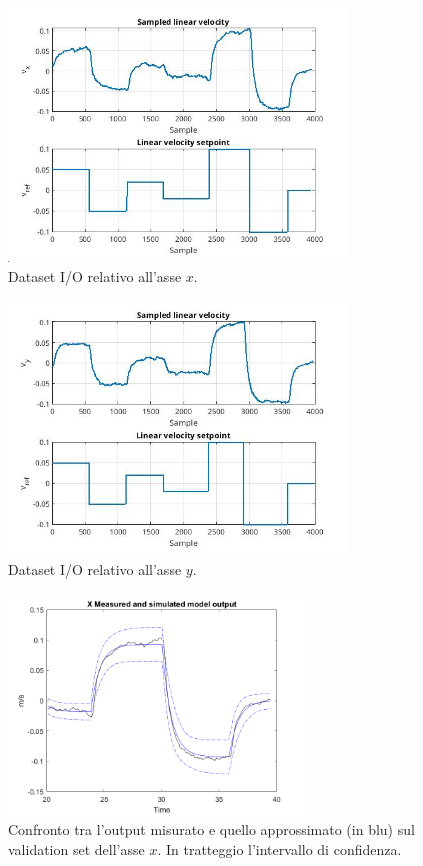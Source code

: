 \begin{figure}
    \centering
    \includegraphics[width=0.8\textwidth]{figs/chapter4/xdataset.jpg}
    \caption{Dataset I/O relativo all'asse $x$.}
    \label{fig:xdataset}
\end{figure}

\begin{figure}
    \centering
    \includegraphics[width=0.8\textwidth]{figs/chapter4/ydataset.jpg}
    \caption{Dataset I/O relativo all'asse $y$.}
    \label{fig:ydataset}
\end{figure}

\begin{figure}
    \centering
    \includegraphics[width=0.7\textwidth]{figs/chapter4/valxtimeplot.png}
    \caption{Confronto tra l'output misurato e quello approssimato (in blu) sul validation set dell'asse $x$. In tratteggio l'intervallo di confidenza.}
    \label{fig:xvalerr}
\end{figure}

